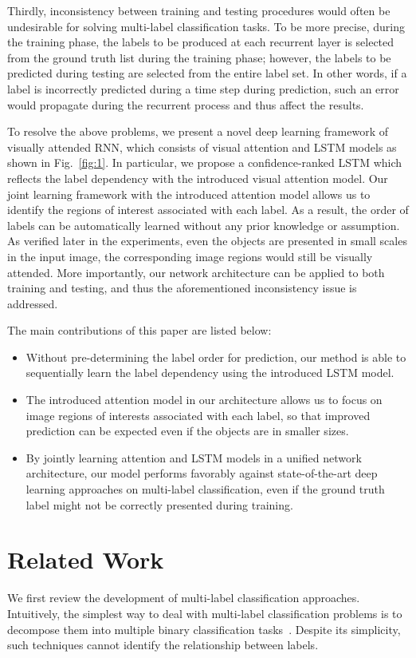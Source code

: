 \documentclass[letterpaper]{article} %
\begin{document}
Thirdly, inconsistency between training and testing procedures would often be undesirable for solving multi-label classification tasks. To be more precise, during the training phase, the labels to be produced at each recurrent layer is selected from the ground truth list during the training phase; however, the labels to be predicted during testing are selected from the entire label set. In other words, if a label is incorrectly predicted during a time step during prediction, such an error would propagate during the recurrent process and thus affect the results.

To resolve the above problems, we present a novel deep learning framework of visually attended RNN, which consists of visual attention and LSTM models as shown in Fig.~\ref{fig:1}. In particular, we propose a confidence-ranked LSTM which reflects the label dependency with the introduced visual attention model. Our joint learning framework with the introduced attention model allows us to identify the regions of interest associated with each label. As a result, the order of labels can be automatically learned without any prior knowledge or assumption. As verified later in the experiments, even the objects are presented in small scales in the input image, the corresponding image regions would still be visually attended. More importantly, our network architecture can be applied to both training and testing, and thus the aforementioned inconsistency issue is addressed.


The main contributions of this paper are listed below: %
\begin{itemize}
\item Without pre-determining the label order for prediction, our method is able to sequentially learn the label dependency using the introduced LSTM model.
\item The introduced attention model in our architecture allows us to focus on image regions of interests associated with each label, so that improved prediction can be expected even if the objects are in smaller sizes.
\item By jointly learning attention and LSTM models in a unified network architecture, our model performs favorably against state-of-the-art deep learning approaches on multi-label classification, even if the ground truth label might not be correctly presented during training.
\end{itemize}


\section{Related Work}
\label{sec:rewo}
We first review the development of multi-label classification approaches. Intuitively, the simplest way to deal with multi-label classification problems is to decompose them into multiple binary classification tasks~\cite{tsoumakas2006multi}. Despite its simplicity, such techniques cannot identify the relationship between labels.
\end{document}
